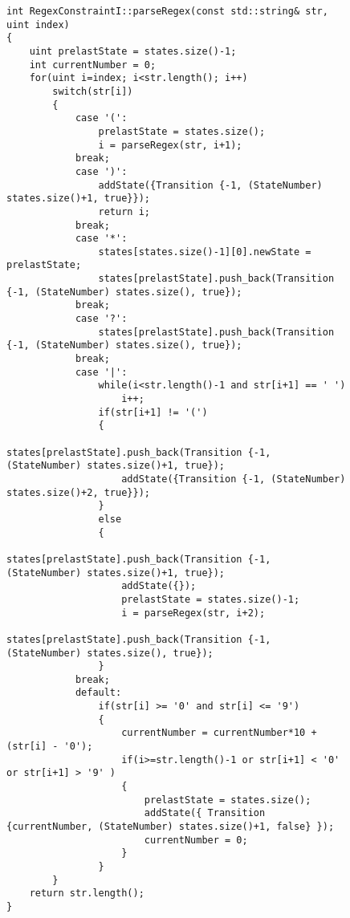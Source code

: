 \begin{figure}
\begin{lstlisting}[caption=Metoda kompilująca wyrażenie regularne do automatu NFA, style=customc, label=alg:parseRegex]
int RegexConstraintI::parseRegex(const std::string& str, uint index)
{
    uint prelastState = states.size()-1;
    int currentNumber = 0;
    for(uint i=index; i<str.length(); i++)
        switch(str[i])
        {
            case '(':
                prelastState = states.size();
                i = parseRegex(str, i+1);
            break;
            case ')':
                addState({Transition {-1, (StateNumber) states.size()+1, true}});
                return i;
            break;
            case '*':
                states[states.size()-1][0].newState = prelastState;
                states[prelastState].push_back(Transition {-1, (StateNumber) states.size(), true});
            break;
            case '?':
                states[prelastState].push_back(Transition {-1, (StateNumber) states.size(), true});
            break;
            case '|':
                while(i<str.length()-1 and str[i+1] == ' ')
                    i++;
                if(str[i+1] != '(')
                {
                    states[prelastState].push_back(Transition {-1, (StateNumber) states.size()+1, true});
                    addState({Transition {-1, (StateNumber) states.size()+2, true}});
                }
                else
                {
                    states[prelastState].push_back(Transition {-1, (StateNumber) states.size()+1, true});
                    addState({});
                    prelastState = states.size()-1;
                    i = parseRegex(str, i+2);
                    states[prelastState].push_back(Transition {-1, (StateNumber) states.size(), true});
                }
            break;
            default:
                if(str[i] >= '0' and str[i] <= '9')
                {
                    currentNumber = currentNumber*10 + (str[i] - '0');
                    if(i>=str.length()-1 or str[i+1] < '0' or str[i+1] > '9' )
                    {
                        prelastState = states.size();
                        addState({ Transition {currentNumber, (StateNumber) states.size()+1, false} });
                        currentNumber = 0;
                    }
                }
        }
    return str.length();
}
\end{lstlisting}
\end{figure}
